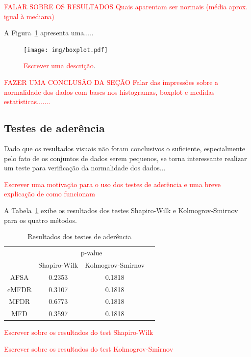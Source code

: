 \documentclass[conference]{IEEEtran}
\begin{document}
\textcolor{red}{FALAR SOBRE OS RESULTADOS
Quais aparentam ser normais (média aprox. igual à mediana)
}


A Figura~\ref{fig:boxplot} apresenta uma.....

\begin{figure}[h]
	\centering
	\texttt{[image: img/boxplot.pdf]}
	\caption{\textcolor{red}{Escrever uma descrição}.}
	\label{fig:boxplot}
\end{figure}



\textcolor{red}{FAZER UMA CONCLUSÃO DA SEÇÃO
Falar das impressões sobre a normalidade dos dados com bases nos histogramas, boxplot e medidas estatísticas.......}

\subsection{Testes de aderência}
Dado que os resultados visuais não foram conclusivos o suficiente, especialmente pelo fato de os conjuntos de dados serem pequenos, se torna interessante realizar um teste para verificação da normalidade dos dados...

\textcolor{red}{Escrever uma motivação para o uso dos testes de aderência e uma breve explicação de como funcionam}

A Tabela~\ref{tab:aderencia} exibe os resultados dos testes Shapiro-Wilk e Kolmogrov-Smirnov para os quatro métodos.

\begin{table}[h]
	\centering
	\caption{Resultados dos testes de aderência}
	\label{tab:aderencia}
	\begin{tabular}{c|ccc}
		\hline
		& \multicolumn{2}{c}{p-value}      \\
		\cline{2-3}
		& Shapiro-Wilk & Kolmogrov-Smirnov \\
		\hline
		AFSA  & 0.2353       & 0.1818            \\
		cMFDR & 0.3107       & 0.1818            \\
		MFDR  & 0.6773       & 0.1818            \\
		MFD   & 0.3597       &  0.1818               \\
		\hline
	\end{tabular}
\end{table}

\textcolor{red}{Escrever sobre os resultados do test Shapiro-Wilk}

\textcolor{red}{Escrever sobre os resultados do test Kolmogrov-Smirnov}
\end{document}
